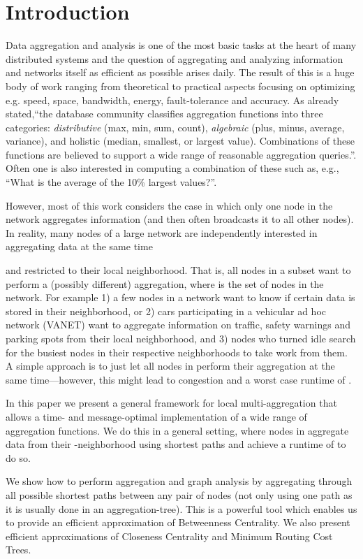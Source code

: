 \documentclass[11pt]{article}
\begin{document}
\section{Introduction}
Data aggregation and analysis is one of the most basic tasks at the heart of many distributed systems and the question of aggregating and analyzing information and networks itself as efficient as possible arises daily. The result of this is a huge body of work ranging from theoretical to practical aspects focusing on optimizing e.g. speed, space, bandwidth, energy, fault-tolerance and accuracy. As already \cite{kuhn2008distributed} stated,``the database community classifies aggregation functions
into three categories: \emph{distributive} (max, min, sum, count), \emph{algebraic} (plus, minus, average, variance), and holistic (median,  smallest, or  largest value). Combinations of these functions are believed to support a wide range of reasonable aggregation queries.''. Often one is also interested in computing a combination of these such as, e.g., ``What is the average of the 10\% largest values?''\cite{kuhn2008distributed}.

However, most of this work considers the case in which only one node in the network aggregates information (and then often broadcasts it to all other nodes). In reality, many nodes of a large network are independently interested in aggregating data at the same time 

and restricted to their local neighborhood. That is, all nodes in a subset  want to perform a (possibly different) aggregation, where  is the set of nodes in the network.  For example 1) a few nodes in a network want to know if certain data is stored in their neighborhood, or 2) cars participating in a vehicular ad hoc network (VANET) want to aggregate information on traffic, safety warnings and parking spots from their local neighborhood, and 3) nodes who turned idle search for the busiest nodes in their respective neighborhoods to take work from them. A simple approach is to just let all nodes in  perform their aggregation at the same time---however, this might lead to congestion and a worst case runtime of . 


In this paper we present a general framework for local multi-aggregation that allows a time- and message-optimal implementation of a wide range of aggregation functions. We do this in a general setting, where nodes in  aggregate data from their -neighborhood using shortest paths and achieve a runtime of  to do so. 


We show how to perform aggregation and graph analysis by aggregating through all possible shortest paths between any pair of nodes (not only using one path as it is usually done in an aggregation-tree). This is a powerful tool which enables us to provide an efficient approximation of Betweenness Centrality. We also present efficient approximations of Closeness Centrality and Minimum Routing Cost Trees. 
\end{document}
